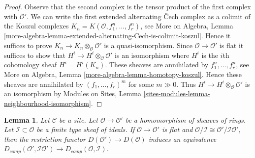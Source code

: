 \documentclass{stacks-project}
\theoremstyle{plain}
\newtheorem{lemma}[subsection]{Lemma}
\theoremstyle{definition}
\theoremstyle{remark}
\numberwithin{equation}{subsection}
\begin{document}
\begin{proof}
Observe that the second complex is the tensor product of the first
complex with $\mathcal{O}'$. We can write the first extended
alternating {\v C}ech complex as a colimit of the Koszul complexes
$K_n = K(\mathcal{O}, f_1^n, \ldots, f_r^n)$, see
More on Algebra, Lemma
\ref{more-algebra-lemma-extended-alternating-Cech-is-colimit-koszul}.
Hence it suffices to prove $K_n \to K_n \otimes_\mathcal{O} \mathcal{O}'$
is a quasi-isomorphism. Since $\mathcal{O} \to \mathcal{O}'$ is flat
it suffices to show that $H^i \to H^i \otimes_\mathcal{O} \mathcal{O}'$
is an isomorphism where $H^i$ is the $i$th cohomology sheaf
$H^i = H^i(K_n)$. These sheaves are annihilated by $f_1^n, \ldots, f_r^n$, see
More on Algebra, Lemma \ref{more-algebra-lemma-homotopy-koszul}.
Hence these sheaves are annihilated by $(f_1, \ldots, f_r)^m$
for some $m \gg 0$. Thus $H^i \to H^i \otimes_\mathcal{O} \mathcal{O}'$
is an isomorphism by Modules on Sites, Lemma
\ref{sites-modules-lemma-neighbourhood-isomorphism}.
\end{proof}

\begin{lemma}
\label{lemma-restriction-derived-complete-equivalence}
Let $\mathcal{C}$ be a site. Let $\mathcal{O} \to \mathcal{O}'$ be a
homomorphism of sheaves of rings. Let $\mathcal{I} \subset \mathcal{O}$
be a finite type sheaf of ideals.
If $\mathcal{O} \to \mathcal{O}'$ is flat and
$\mathcal{O}/\mathcal{I} \cong \mathcal{O}'/\mathcal{I}\mathcal{O}'$,
then the restriction functor $D(\mathcal{O}') \to D(\mathcal{O})$
induces an equivalence
$D_{comp}(\mathcal{O}', \mathcal{I}\mathcal{O}') \to
D_{comp}(\mathcal{O}, \mathcal{I})$.
\end{lemma}
\end{document}

